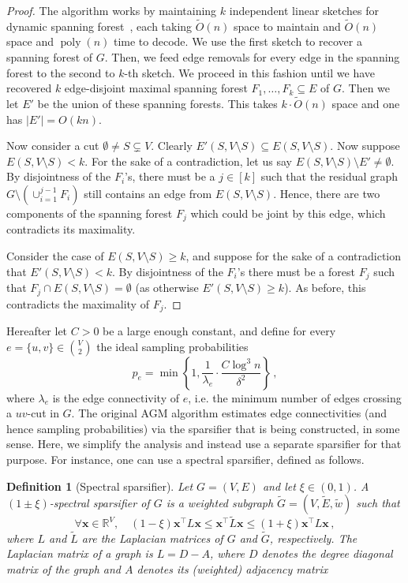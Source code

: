 \documentclass[epsfig,letter,11pt]{article}
\numberwithin{equation}{section}
\newcommand\vt[1]{\mathbf{#1}}
\newcommand{\otil}{\tilde{O}}
\renewcommand{\tilde}{\widetilde}
\DeclareMathOperator*{\poly}{poly}
\newtheorem{definition}[theorem]{Definition}
\begin{document}
\begin{proof}
	The algorithm works by maintaining $k$ independent linear sketches for dynamic spanning forest~\cite{linmeas}, each taking $\otil(n)$ space to maintain and $\otil(n)$ space and $\poly(n)$ time to decode. We use the first sketch to recover a spanning forest of $G$. Then, we feed edge removals for every edge in the spanning forest to the second to $k$-th sketch. We proceed in this fashion until we have recovered $k$ edge-disjoint maximal spanning forest $F_1, \dots, F_k \subseteq E$ of $G$. Then we let $E'$ be the union of these spanning forests. This takes $k \cdot \otil(n)$ space and one has $|E'| = O(kn)$.
	
	Now consider a cut $\emptyset \neq S \subsetneq V$. Clearly $E'(S,V \setminus S) \subseteq E(S,V \setminus S)$. Now suppose $E(S,V \setminus S) < k$. For the sake of a contradiction, let us say $E(S,V \setminus S) \setminus E' \neq \emptyset$. By disjointness of the $F_i$'s, there must be a $j \in [k]$ such that the residual graph $G \setminus (\cup_{i=1}^{j-1} F_i)$ still contains an edge from $E(S,V \setminus S)$. Hence, there are two components of the spanning forest $F_j$ which could be joint by this edge, which contradicts its maximality.
	
	Consider the case of $E(S,V \setminus S) \ge k$, and suppose for the sake of a contradiction that $E'(S,V \setminus S) < k$. By disjointness of the $F_i$'s there must be a forest $F_j$ such that $F_j \cap E(S,V \setminus S) = \emptyset$ (as otherwise $E'(S,V \setminus S) \ge k$). As before, this contradicts the maximality of $F_j$.
\end{proof}
\noindent
Hereafter let $C>0$ be a large enough constant, and define for every $e=\{u,v\} \in \binom{V}{2}$ the ideal sampling probabilities
\begin{equation*}
	p_e = \min \left\{1, \frac{1}{\lambda_e}\cdot\frac{C \log^3 n}{\delta^2} \right\} \, ,
\end{equation*}
where $\lambda_e$ is the edge connectivity of $e$, i.e. the minimum number of edges crossing a $uv$-cut in $G$. The original AGM algorithm estimates edge connectivities (and hence sampling probabilities) via the sparsifier that is being constructed, in some sense. Here, we simplify the analysis and instead use a separate sparsifier for that purpose. For instance, one can use a spectral sparsifier, defined as follows.
\begin{definition}[Spectral sparsifier]
	Let $G=(V,E)$ and let $\xi \in (0,1)$. A $(1\pm \xi)$-spectral sparsifier of $G$ is a weighted subgraph $\tilde{G} = (V,\tilde{E},\tilde{w})$ such that
	\begin{equation*}
		\forall \vt{x} \in \mathbb{R}^V , \quad (1-\xi)\vt{x}^\top L \vt{x} \le \vt{x}^\top \tilde{L} \vt{x} \le (1+\xi)\vt{x}^\top L \vt{x} \, ,
	\end{equation*}
	where $L$ and  $\tilde{L}$ are the Laplacian matrices of $G$ and $\tilde{G}$, respectively.
	The Laplacian matrix of a graph is $L=D-A$, where $D$ denotes the degree diagonal matrix of the graph and $A$ denotes its (weighted) adjacency matrix
\end{definition}\noindent
\end{document}
